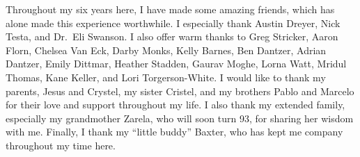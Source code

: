 \begin{acknowledgment}
Throughout my six years here, I have made some amazing friends,
which has alone made this experience worthwhile.
%
I especially thank Austin Dreyer, Nick Testa, and Dr.\ Eli Swanson.
%
I also offer warm thanks to Greg Stricker, Aaron Florn, Chelsea Van Eck,
Darby Monks, Kelly Barnes, Ben Dantzer, Adrian Dantzer, Emily Dittmar,
Heather Stadden, Gaurav Moghe, Lorna Watt, Mridul Thomas,
Kane Keller, and Lori Torgerson-White.
%
I would like to thank my parents, Jesus and Crystel,
my sister Cristel, and my brothers Pablo and Marcelo
for their love and support throughout my life.
%
I also thank my extended family, especially my grandmother Zarela,
who will soon turn 93, for sharing her wisdom with me.
%
Finally, I thank my ``little buddy'' Baxter,
who has kept me company throughout my time here.

\end{acknowledgment}
